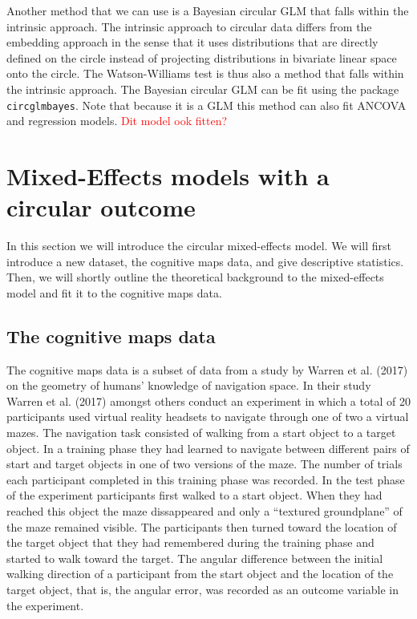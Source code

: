 \documentclass[11pt,]{article}
\begin{document}
Another method that we can use is a Bayesian circular GLM that falls
within the intrinsic approach. The intrinsic approach to circular data
differs from the embedding approach in the sense that it uses
distributions that are directly defined on the circle instead of
projecting distributions in bivariate linear space onto the circle. The
Watson-Williams test is thus also a method that falls within the
intrinsic approach. The Bayesian circular GLM can be fit using the
package \verb|circglmbayes|. Note that because it is a GLM this method
can also fit ANCOVA and regression models.
\textcolor{red}{Dit model ook fitten?}

\section{Mixed-Effects models with a circular outcome}\label{MEModel}

In this section we will introduce the circular mixed-effects model. We
will first introduce a new dataset, the cognitive maps data, and give
descriptive statistics. Then, we will shortly outline the theoretical
background to the mixed-effects model and fit it to the cognitive maps
data.

\subsection{The cognitive maps data}\label{CogMap}

The cognitive maps data is a subset of data from a study by Warren et
al. (2017) on the geometry of humans' knowledge of navigation space. In
their study Warren et al. (2017) amongst others conduct an experiment in
which a total of 20 participants used virtual reality headsets to
navigate through one of two a virtual mazes. The navigation task
consisted of walking from a start object to a target object. In a
training phase they had learned to navigate between different pairs of
start and target objects in one of two versions of the maze. The number
of trials each participant completed in this training phase was
recorded. In the test phase of the experiment participants first walked
to a start object. When they had reached this object the maze
dissappeared and only a ``textured groundplane'' of the maze remained
visible. The participants then turned toward the location of the target
object that they had remembered during the training phase and started to
walk toward the target. The angular difference between the initial
walking direction of a participant from the start object and the
location of the target object, that is, the angular error, was recorded
as an outcome variable in the experiment.
\end{document}
